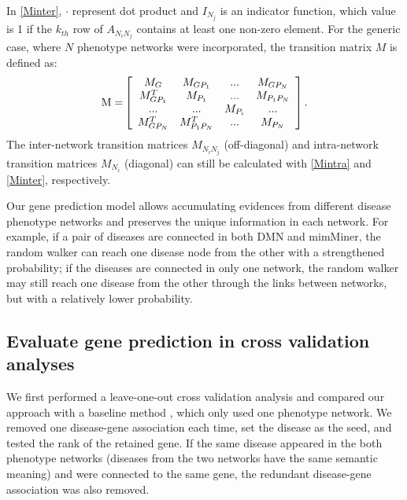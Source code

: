In \eqref{Minter}, $\cdot$ represent dot product and $I_{N_j}$ is an indicator function,
which value is 1 if the $k_{th}$ row of $A_{{N_i}{N_j}}$ contains at least one non-zero element.
For the generic case, where $N$ phenotype networks were incorporated,
the transition matrix $M$ is defined as:
\begin{equation}
 {\rm{M = }}\left[ {\begin{array}{*{20}{c}}
{{M_G}}&{{M_{G{P_1}}}}&{...}&{{M_{G{P_N}}}}\\
{M_{G{P_1}}^T}&{{M_{{P_1}}}}&{...}&{{M_{{P_1}{P_N}}}}\\
{...}&{...}&{{M_{{P_i}}}}&{...}\\
{M_{G{P_N}}^T}&{M_{{P_1}{P_N}}^T}&{...}&{{M_{{P_N}}}}
\end{array}} \right].
\end{equation}
The inter-network transition matrices $M_{{N_i}{N_j}}$ (off-diagonal)
and intra-network transition matrices $M_{N_i}$ (diagonal) can still be calculated
with \eqref{Mintra} and \eqref{Minter}, respectively.


Our gene prediction model allows accumulating
evidences from different disease phenotype networks and
preserves the unique information in each network.
For example, if a pair of diseases are
connected in both DMN and mimMiner, the random walker
can reach one disease node from the other with a strengthened probability;
if the diseases are connected in only one network,
the random walker may still reach one disease from the other
through the links between networks,
but with a relatively lower probability.

\subsection{Evaluate gene prediction in cross validation analyses}
We first performed a leave-one-out cross validation analysis
and compared our approach with a baseline method \cite{li2010genome}, which
only used one phenotype network.
We removed one disease-gene association each time,
set the disease as the seed, and tested the rank of the
retained gene.
If the same disease appeared in the both phenotype networks
(diseases from the two networks have the same semantic meaning)
and were connected to the same gene, the redundant
disease-gene association was also removed.



